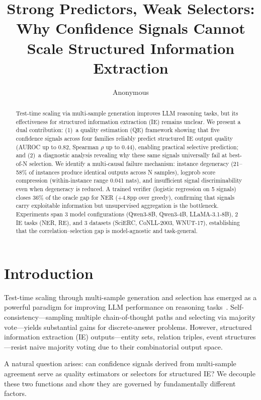\documentclass[11pt,a4paper]{article}
\title{Strong Predictors, Weak Selectors: Why Confidence Signals Cannot Scale Structured Information Extraction}
\author{Anonymous}
\begin{document}
\maketitle

\begin{abstract}
Test-time scaling via multi-sample generation improves LLM reasoning tasks, but its effectiveness for structured information extraction (IE) remains unclear. We present a dual contribution: (1)~a quality estimation (QE) framework showing that five confidence signals across four families reliably predict structured IE output quality (AUROC up to 0.82, Spearman $\rho$ up to 0.44), enabling practical selective prediction; and (2)~a diagnostic analysis revealing why these same signals universally fail at best-of-N selection. We identify a multi-causal failure mechanism: instance degeneracy (21--58\% of instances produce identical outputs across N samples), logprob score compression (within-instance range 0.041 nats), and insufficient signal discriminability even when degeneracy is reduced. A trained verifier (logistic regression on 5 signals) closes 36\% of the oracle gap for NER (+4.8pp over greedy), confirming that signals carry exploitable information but unsupervised aggregation is the bottleneck. Experiments span 3 model configurations (Qwen3-8B, Qwen3-4B, LLaMA-3.1-8B), 2 IE tasks (NER, RE), and 3 datasets (SciERC, CoNLL-2003, WNUT-17), establishing that the correlation--selection gap is model-agnostic and task-general.
\end{abstract}

\section{Introduction}

Test-time scaling through multi-sample generation and selection has emerged as a powerful paradigm for improving LLM performance on reasoning tasks~\cite{wang2023selfconsistency,brown2024large,snell2024scaling}. Self-consistency---sampling multiple chain-of-thought paths and selecting via majority vote---yields substantial gains for discrete-answer problems. However, structured information extraction (IE) outputs---entity sets, relation triples, event structures---resist naive majority voting due to their combinatorial output space.

A natural question arises: can confidence signals derived from multi-sample agreement serve as quality estimators or selectors for structured IE? We decouple these two functions and show they are governed by fundamentally different factors.
\end{document}

